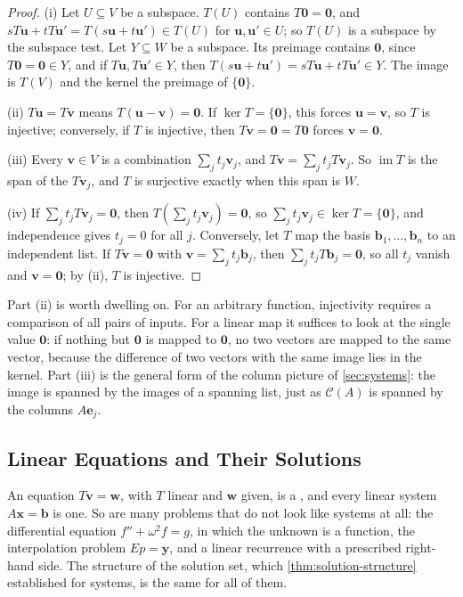 \begin{proof}
(i) Let $U\subseteq V$ be a subspace. $T(U)$ contains $T\mathbf 0=\mathbf 0$, and $sT\mathbf u+tT\mathbf u'=T(s\mathbf u+t\mathbf u')\in T(U)$ for $\mathbf u,\mathbf u'\in U$; so $T(U)$ is a subspace by the subspace test. Let $Y\subseteq W$ be a subspace. Its preimage contains $\mathbf 0$, since $T\mathbf 0=\mathbf 0\in Y$, and if $T\mathbf u,T\mathbf u'\in Y$, then $T(s\mathbf u+t\mathbf u')=sT\mathbf u+tT\mathbf u'\in Y$. The image is $T(V)$ and the kernel the preimage of $\{\mathbf 0\}$.

(ii) $T\mathbf u=T\mathbf v$ means $T(\mathbf u-\mathbf v)=\mathbf 0$. If $\ker T=\{\mathbf 0\}$, this forces $\mathbf u=\mathbf v$, so $T$ is injective; conversely, if $T$ is injective, then $T\mathbf v=\mathbf 0=T\mathbf 0$ forces $\mathbf v=\mathbf 0$.

(iii) Every $\mathbf v\in V$ is a combination $\sum_jt_j\mathbf v_j$, and $T\mathbf v=\sum_jt_jT\mathbf v_j$. So $\operatorname{im}T$ is the span of the $T\mathbf v_j$, and $T$ is surjective exactly when this span is $W$.

(iv) If $\sum_jt_jT\mathbf v_j=\mathbf 0$, then $T(\sum_jt_j\mathbf v_j)=\mathbf 0$, so $\sum_jt_j\mathbf v_j\in\ker T=\{\mathbf 0\}$, and independence gives $t_j=0$ for all $j$. Conversely, let $T$ map the basis $\mathbf b_1,\ldots,\mathbf b_n$ to an independent list. If $T\mathbf v=\mathbf 0$ with $\mathbf v=\sum_jt_j\mathbf b_j$, then $\sum_jt_jT\mathbf b_j=\mathbf 0$, so all $t_j$ vanish and $\mathbf v=\mathbf 0$; by (ii), $T$ is injective.
\end{proof}

Part (ii) is worth dwelling on. For an arbitrary function, injectivity requires a comparison of all pairs of inputs. For a linear map it suffices to look at the single value $\mathbf 0$: if nothing but $\mathbf 0$ is mapped to $\mathbf 0$, no two vectors are mapped to the same vector, because the difference of two vectors with the same image lies in the kernel. Part (iii) is the general form of the column picture of \cref{sec:systems}: the image is spanned by the images of a spanning list, just as $\mathcal C(A)$ is spanned by the columns $A\mathbf e_j$.

\subsection{Linear Equations and Their Solutions}

An equation $T\mathbf v=\mathbf w$, with $T$ linear and $\mathbf w$ given, is a , and every linear system $A\mathbf x=\mathbf b$ is one. So are many problems that do not look like systems at all: the differential equation $f''+\omega^2f=g$, in which the unknown is a function, the interpolation problem $Ep=\mathbf y$, and a linear recurrence with a prescribed right-hand side. The structure of the solution set, which \cref{thm:solution-structure} established for systems, is the same for all of them.

